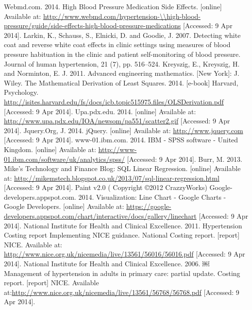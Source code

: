\documentclass[11pt]{article}
\begin{document}
\begin{thebibliography}{40}
\footnotesize
\begin{singlespace}

Webmd.com. 2014. High Blood Pressure Medication Side Effects. [online] Available at: \url{http://www.webmd.com/hypertension-\\high-blood-pressure/guide/side-effects-high-blood-pressure-medications} [Accessed: 9 Apr 2014].
Larkin, K., Schauss, S., Elnicki, D. and Goodie, J. 2007. Detecting white coat and reverse white coat effects in clinic settings using measures of blood pressure habituation in the clinic and patient self-monitoring of blood pressure. Journal of human hypertension, 21 (7), pp. 516--524.
Kreyszig, E., Kreyszig, H. and Norminton, E. J. 2011. Advanced engineering mathematics. [New York]: J. Wiley.
The Mathematical Derivation of Least Squares. 2014. [e-book] Harvard, Psychology. \url{http://isites.harvard.edu/fs/docs/icb.topic515975.files/OLSDerivation.pdf} [Accessed: 9 Apr 2014].
Upa.pdx.edu. 2014. [online] Available at: \url{http://www.upa.pdx.edu/IOA/newsom/pa551/scatter2.gif} [Accessed: 9 Apr 2014].
Jquery.Org, J. 2014. jQuery. [online] Available at: \url{http://www.jquery.com} [Accessed: 9 Apr 2014].
www-01.ibm.com. 2014. IBM - SPSS software - United Kingdom. [online] Available at: \url{http://www-01.ibm.com/software/uk/analytics/spss/} [Accessed: 9 Apr 2014].
Burr, M. 2013. Mike's Technology and Finance Blog: SQL Linear Regression. [online] Available at: \url{http://mikemstech.blogspot.co.uk/2013/07/sql-linear-regression.html} [Accessed: 9 Apr 2014].
Paint v2.0 ( Copyright ©2012 CrazzyWorks) 
Google-developers.appspot.com. 2014. Visualization: Line Chart - Google Charts - Google Developers. [online] Available at: \url{https://google-developers.appspot.com/chart/interactive/docs/gallery/linechart} [Accessed: 9 Apr 2014].
National Institute for Health and Clinical Excellence. 2011. Hypertension Costing report Implementing NICE guidance. National Costing report. [report] NICE. Available at: \url{http://www.nice.org.uk/nicemedia/live/13561/56016/56016.pdf} [Accessed: 9 Apr 2014].
National Institute for Health and Clinical Excellence. 2006. ￼ Management of hypertension in adults in primary care: partial update. Costing report. [report] NICE. Available at:\url{http://www.nice.org.uk/nicemedia/live/13561/56768/56768.pdf} [Accessed: 9 Apr 2014].

\end{singlespace}
\end{thebibliography}
\end{document}
